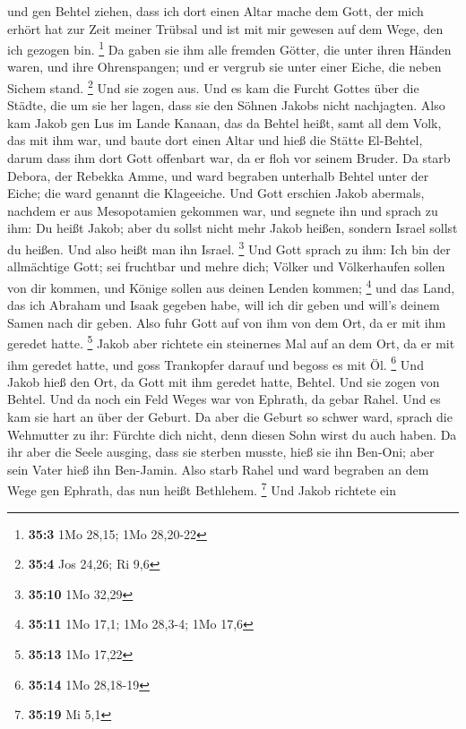 und gen Behtel ziehen, dass ich dort einen Altar mache dem Gott, der
mich erhört hat zur Zeit meiner Trübsal und ist mit mir gewesen auf dem
Wege, den ich gezogen bin. \footnote{\textbf{35:3} 1Mo 28,15; 1Mo
  28,20-22}  Da gaben sie ihm alle fremden Götter, die
unter ihren Händen waren, und ihre Ohrenspangen; und er vergrub sie
unter einer Eiche, die neben Sichem stand. \footnote{\textbf{35:4} Jos
  24,26; Ri 9,6}  Und sie zogen aus. Und es kam die Furcht
Gottes über die Städte, die um sie her lagen, dass sie den Söhnen Jakobs
nicht nachjagten.  Also kam Jakob gen Lus im Lande Kanaan,
das da Behtel heißt, samt all dem Volk, das mit ihm war, 
und baute dort einen Altar und hieß die Stätte El-Behtel, darum dass ihm
dort Gott offenbart war, da er floh vor seinem Bruder.  Da
starb Debora, der Rebekka Amme, und ward begraben unterhalb Behtel unter
der Eiche; die ward genannt die Klageeiche.  Und Gott
erschien Jakob abermals, nachdem er aus Mesopotamien gekommen war, und
segnete ihn  und sprach zu ihm: Du heißt Jakob; aber du
sollst nicht mehr Jakob heißen, sondern Israel sollst du heißen. Und
also heißt man ihn Israel. \footnote{\textbf{35:10} 1Mo 32,29}
 Und Gott sprach zu ihm: Ich bin der allmächtige Gott;
sei fruchtbar und mehre dich; Völker und Völkerhaufen sollen von dir
kommen, und Könige sollen aus deinen Lenden kommen; \footnote{\textbf{35:11}
  1Mo 17,1; 1Mo 28,3-4; 1Mo 17,6}  und das Land, das ich
Abraham und Isaak gegeben habe, will ich dir geben und will's deinem
Samen nach dir geben.  Also fuhr Gott auf von ihm von dem
Ort, da er mit ihm geredet hatte. \footnote{\textbf{35:13} 1Mo 17,22}
 Jakob aber richtete ein steinernes Mal auf an dem Ort,
da er mit ihm geredet hatte, und goss Trankopfer darauf und begoss es
mit Öl. \footnote{\textbf{35:14} 1Mo 28,18-19}  Und Jakob
hieß den Ort, da Gott mit ihm geredet hatte, Behtel.  Und
sie zogen von Behtel. Und da noch ein Feld Weges war von Ephrath, da
gebar Rahel.  Und es kam sie hart an über der Geburt. Da
aber die Geburt so schwer ward, sprach die Wehmutter zu ihr: Fürchte
dich nicht, denn diesen Sohn wirst du auch haben.  Da ihr
aber die Seele ausging, dass sie sterben musste, hieß sie ihn Ben-Oni;
aber sein Vater hieß ihn Ben-Jamin.  Also starb Rahel und
ward begraben an dem Wege gen Ephrath, das nun heißt Bethlehem.
\footnote{\textbf{35:19} Mi 5,1}  Und Jakob richtete ein
